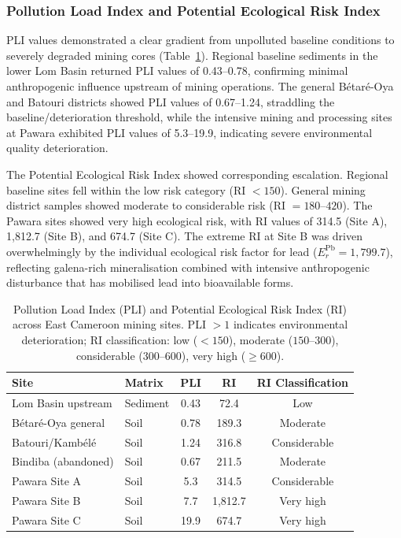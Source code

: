 \documentclass[preprint,12pt,number]{elsarticle}
\begin{document}
\subsubsection{Pollution Load Index and Potential Ecological Risk Index}

PLI values demonstrated a clear gradient from unpolluted baseline conditions to severely degraded mining cores (Table~\ref{tab:pli_ri}). Regional baseline sediments in the lower Lom Basin returned PLI values of 0.43--0.78, confirming minimal anthropogenic influence upstream of mining operations. The general B\'{e}tar\'{e}-Oya and Batouri districts showed PLI values of 0.67--1.24, straddling the baseline/deterioration threshold, while the intensive mining and processing sites at Pawara exhibited PLI values of 5.3--19.9, indicating severe environmental quality deterioration.

The Potential Ecological Risk Index showed corresponding escalation. Regional baseline sites fell within the low risk category (RI $< 150$). General mining district samples showed moderate to considerable risk (RI $= 180$--$420$). The Pawara sites showed very high ecological risk, with RI values of 314.5 (Site A), 1,812.7 (Site B), and 674.7 (Site C). The extreme RI at Site B was driven overwhelmingly by the individual ecological risk factor for lead ($E_r^\text{Pb} = 1{,}799.7$), reflecting galena-rich mineralisation combined with intensive anthropogenic disturbance that has mobilised lead into bioavailable forms.

\begin{table}[h!]
\centering
\caption{Pollution Load Index (PLI) and Potential Ecological Risk Index (RI) across East Cameroon mining sites. PLI $> 1$ indicates environmental deterioration; RI classification: low ($<150$), moderate ($150$--$300$), considerable ($300$--$600$), very high ($\geq 600$).}
\label{tab:pli_ri}
\small
\begin{tabular}{llccc}
\toprule
Site & Matrix & PLI & RI & RI Classification \\
\midrule
Lom Basin upstream & Sediment & 0.43 & 72.4 & Low \\
B\'{e}tar\'{e}-Oya general & Soil & 0.78 & 189.3 & Moderate \\
Batouri/Kamb\'{e}l\'{e} & Soil & 1.24 & 316.8 & Considerable \\
Bindiba (abandoned) & Soil & 0.67 & 211.5 & Moderate \\
Pawara Site A & Soil & 5.3 & 314.5 & Considerable \\
Pawara Site B & Soil & 7.7 & 1,812.7 & Very high \\
Pawara Site C & Soil & 19.9 & 674.7 & Very high \\
\bottomrule
\end{tabular}
\end{table}
\end{document}
